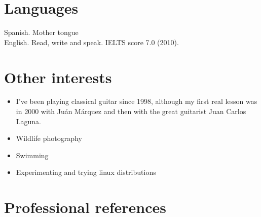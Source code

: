 \documentclass[12pt, a4paper]{article}
\begin{document}
\section*{Languages}

{\sc Spanish}. Mother tongue\\
{\sc English}. Read, write and speak. IELTS score 7.0 (2010).\\

\section*{Other interests}

\begin{itemize}
	\item I've been playing classical guitar since 1998, although my first real lesson was in 2000 with Ju\'an M\'arquez and then with the great guitarist Juan Carlos Laguna.
	\item Wildlife photography
	\item Swimming
	\item Experimenting and trying linux distributions
\end{itemize}


\section*{Professional references}
\end{document}
